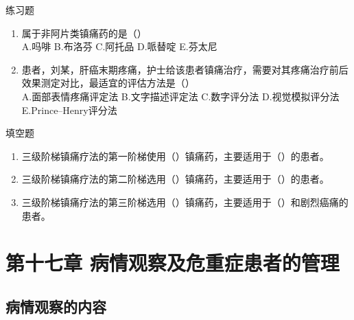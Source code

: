 \documentclass[11pt, a4paper]{ctexart}
\begin{document}
\begin{examplebox}{练习题}
	\begin{enumerate}
		\item 属于非阿片类镇痛药的是（\qquad）\\
		      A.吗啡 \quad B.布洛芬 \quad C.阿托品 \quad D.哌替啶 \quad E.芬太尼
		\item 患者，刘某，肝癌末期疼痛，护士给该患者镇痛治疗，需要对其疼痛治疗前后效果测定对比，最适宜的评估方法是（\qquad）\\
		      A.面部表情疼痛评定法 \quad B.文字描述评定法 \quad C.数字评分法 \quad D.视觉模拟评分法 \quad E.Prince–Henry评分法
	\end{enumerate}
\end{examplebox}

\begin{tipsbox}{填空题}
	\begin{enumerate}
		\item 三级阶梯镇痛疗法的第一阶梯使用（\qquad）镇痛药，主要适用于（\qquad）的患者。
		\item 三级阶梯镇痛疗法的第二阶梯选用（\qquad）镇痛药，主要适用于（\qquad）的患者。
		\item 三级阶梯镇痛疗法的第三阶梯选用（\qquad）镇痛药，主要适用于（\qquad）和剧烈癌痛的患者。
	\end{enumerate}
\end{tipsbox}

\section{第十七章 病情观察及危重症患者的管理}
\subsection{病情观察的内容}
\end{document}
